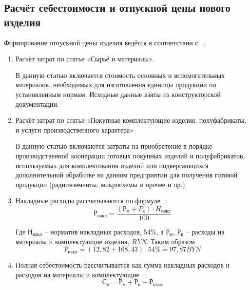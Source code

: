 \subsection{Расчёт себестоимости и отпускной цены нового изделия}

Формирование отпускной цены изделия ведётся в соответствии с
~\cite{bsuir-project-economics}.

\begin{enumerate}
\item Расчёт затрат по статье «Сырьё и материалы».

  В данную статью включается стоимость основных и вспомогательных
  материалов, необходимых для изготовления единицы продукции по
  установленным нормам. Исходные данные взяты из конструкторской
  документации.
  
  

\item Расчёт затрат по статье «Покупные комплектующие изделия,
  полуфабрикаты, и услуги производственного характера»

  В данную статью включаются затраты на приобретение в порядке
  производственной кооперации готовых покупных изделий и полуфабрикатов,
  используемых для комплектования изделий или подвергающихся
  дополнительной обработке на данном предприятии для получения готовой
  продукции (радиоэлементы, микросхемы и прочее и пр.)

  



  
\item Накладные расходы рассчитываются по формуле ~\cite{bsuir-project-economics}:
\begin{equation}
  Р_{накл}=\frac{(Р_м+P_к) \cdot H_{накл}}{100}
\end{equation}

Где  $Н_{накл}$ – норматив накладных расходов, 54\%, а $Р_м$, $Р_к$ – расходы на материалы и комплектующие изделия, \textit{BYN}.
Таким образом
$$  Р_{накл}=(12,82+168,43) \cdot 54\%  = 97,87 BYN$$

\item Полная себестоимость рассчитывается как сумма накладных расходов и
расходов на материалы и комплектующие ~\cite{bsuir-project-economics}:
\begin{equation}
  С_п =Р_м + Р_к + Р_{накл}
\end{equation} 


\end{enumerate}

